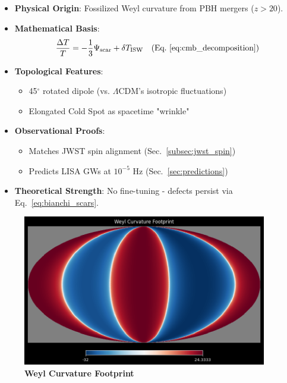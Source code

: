 \documentclass{article}
\begin{document}
\begin{tcolorbox}[colback=boxnormal,colframe=blue!50!black,title=\textbf{Scars' CMB Signature}]
\begin{itemize}
    \item \textbf{Physical Origin}: Fossilized Weyl curvature from PBH mergers ($z>20$).
    \item \textbf{Mathematical Basis}: 
        \begin{equation}
        \frac{\Delta T}{T} = -\frac{1}{3}\Psi_{\rm scar} + \delta T_{\rm ISW} \quad \text{(Eq.~\ref{eq:cmb_decomposition})}
        \end{equation}
    \item \textbf{Topological Features}:
        \begin{itemize}
            \item 45$^\circ$ rotated dipole (vs. $\Lambda$CDM's isotropic fluctuations)
            \item Elongated Cold Spot as spacetime "wrinkle"
        \end{itemize}
    \item \textbf{Observational Proofs}:
        \begin{itemize}
            \item Matches JWST spin alignment (Sec.~\ref{subsec:jwst_spin})
            \item Predicts LISA GWs at $10^{-5}$ Hz (Sec.~\ref{sec:predictions})
        \end{itemize}
    \item \textbf{Theoretical Strength}: No fine-tuning - defects persist via Eq.~\ref{eq:bianchi_scars}.
\end{itemize}
\end{tcolorbox}

\begin{figure}[H]
    \centering
    \includegraphics[width=0.95\textwidth]{figures/weyl_cmb.png}
    \caption{
        \textbf{Weyl Curvature Footprint}
    }
    \label{fig:weyl_cmb}
\end{figure}
\end{document}
